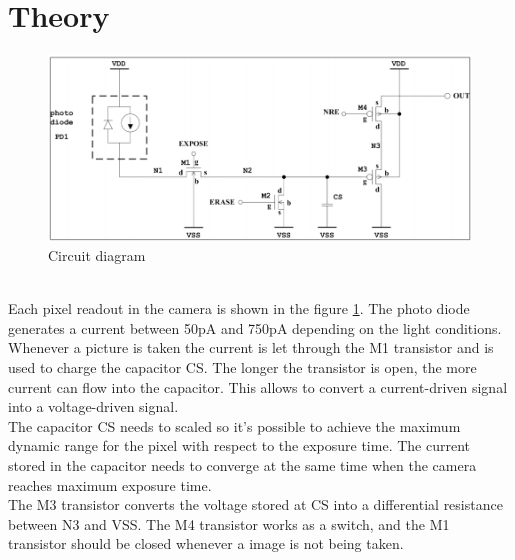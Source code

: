 \section{Theory}

\begin{figure}[htp]
    \centering
    \includegraphics[scale=0.55]{Images/IC_Analog.PNG}
    \caption{Circuit diagram}
    \label{fig:AnalogC}
\end{figure} \\

Each pixel readout in the camera is shown in the figure \ref{fig:AnalogC}. 
The photo diode generates a current between 50pA and 750pA depending on the light conditions. Whenever a picture is taken the current is let through the M1 transistor and is used to charge the capacitor CS. The longer the transistor is open, the more current can flow into the capacitor. This allows to convert a current-driven signal into a voltage-driven signal.\\

The capacitor CS needs to scaled so it's possible to achieve the maximum dynamic range for the pixel with respect to the exposure time. The current stored in the capacitor needs to converge at the same time when the camera reaches maximum exposure time.       \\

The M3 transistor converts the voltage stored at CS into a differential resistance between N3 and VSS. The M4 transistor works as a switch, and the M1 transistor should be closed whenever a image is not being taken.





\newpage